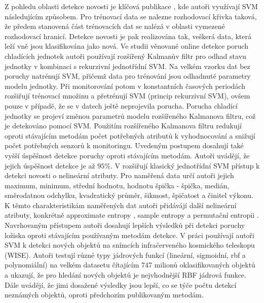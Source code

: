 Z pohledu oblasti detekce novosti je klíčová publikace \cite{svm5}, kde autoři využívají SVM následujícím způsobem. Pro trénovací data se nalezne rozhodovací křivka taková, že předem stanovená část trénovacích dat se nalézá v oblasti vymezené rozhodovací hranicí. Detekce novosti je pak realizována tak, veškerá data, která leží vně jsou klasifikována jako nová. Ve studii věnované online detekce poruch chladících jednotek \cite{svm6} autoři používají rozšířený Kalmanův filtr pro odhad stavu jednotky v kombinaci s rekurzivní jednotřídní SVM. Na velkém vzorku dat bez poruchy natrénují SVM, přičemž data pro trénování jsou odhadnuté parametry modelu jednotky. Při monitorování potom v konstantních časových periodách rozšiřují trénovací množinu a přetrénují SVM (princip rekurzivní SVM), ovšem pouze v případě, že se v datech ještě neprojevila porucha. Porucha chladící jednotky se projeví změnou parametrů modelu rozšířeného Kalmanova filtru, což je detekováno pomocí SVM. Použitím rozšířeného Kalmanova filtru redukují oproti stávajícím metodám počet potřebných atributů k vyhodnocování a snižují počet potřebných senzorů k monitoringu. Uvedeným postupem dosahují také vyšší úspěšnost detekce poruchy oproti stávajícím metodám. Autoři uvádějí, že jejich úspěšnost detekce je až $95\%$. V \cite{svm7} rozšiřují klasický jednotřídní SVM přístup k detekci novosti o nelineární atributy. Pro naměřená data určí autoři jejich maximum, minimum, střední hodnotu, hodnotu špička - špička, medián, směrodatnou odchylku, kvadratický průměr, šikmost, špičatost a činitel výkonu. K těmto charakteristikám naměřených dat autoři přidávájí další nelineární atributy, konkrétně approximate entropy \cite{ae}, sample entropy \cite{se} a permutační entropii \cite{pe}. Navrhovaným přístupem autoři dosahují lepších výsledků při detekci poruchy ložiska oproti stávajícím používaným metodám detekce. V práci \cite{svm8} používají autoři SVM k detekci nových objektů na snímcích infračerveného kosmického teleskopu (WISE). Autoři testují různé typy jádrových funkcí (lineární, sigmoidní, rbf a polynomiální) na velkém datasetu čítajícím 747 milionů oklasifikovaných objektů a ukazují, že pro hledání nových objektů je nejvhodnější RBF jádrová funkce. Dále uvádějí, že  jimi dosažené výsledky jsou lepší, co se týče počtu detekcí neznámých objektů, oproti předchozím publikovaným metodám. 
